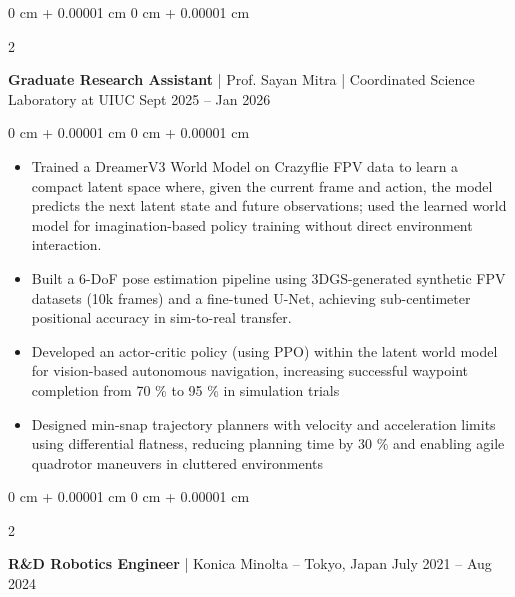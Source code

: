 \documentclass[10pt, letterpaper]{article}
\newenvironment{highlights}{
    \begin{itemize}[
        topsep=0.10 cm,
        parsep=0.10 cm,
        partopsep=0pt,
        itemsep=0pt,
        leftmargin=0 cm + 10pt
    ]
}{
    \end{itemize}
} %
\newenvironment{onecolentry}{
    \begin{adjustwidth}{
        0 cm + 0.00001 cm
    }{
        0 cm + 0.00001 cm
    }
}{
    \end{adjustwidth}
} %
\newenvironment{twocolentry}[2][]{
    \onecolentry
    \def\secondColumn{#2}
    \setcolumnwidth{\fill, 4.5 cm}
    \begin{paracol}{2}
}{
    \switchcolumn \raggedleft \secondColumn
    \end{paracol}
    \endonecolentry
} %
\begin{document}
        \begin{twocolentry}{
            Sept 2025 – Jan 2026
        }
            \textbf{Graduate Research Assistant} | Prof. Sayan Mitra | Coordinated Science Laboratory at UIUC\end{twocolentry}

        \vspace{0.05 cm}
        \begin{onecolentry}
            \begin{highlights}
                \item Trained a DreamerV3 World Model on Crazyflie FPV data to learn a compact latent space where, given the current frame and action, the model predicts the next latent state and future observations; used the learned world model for imagination-based policy training without direct environment interaction.
                \item Built a 6-DoF pose estimation pipeline using 3DGS-generated synthetic FPV datasets (10k frames) and a fine-tuned U-Net, achieving sub-centimeter positional accuracy in sim-to-real transfer.
                \item Developed an actor-critic policy (using PPO) within the latent world model for vision-based autonomous navigation, increasing successful waypoint completion from 70 \% to 95 \% in simulation trials
                \item Designed min-snap trajectory planners with velocity and acceleration limits using differential flatness, reducing planning time by 30 \% and enabling agile quadrotor maneuvers in cluttered environments
            \end{highlights}
        \end{onecolentry}


        \vspace{0.1 cm}


        
        \begin{twocolentry}{
            July 2021 – Aug 2024
        }
            \textbf{R\&D Robotics Engineer} | Konica Minolta -- Tokyo, Japan\end{twocolentry}
\end{document}
